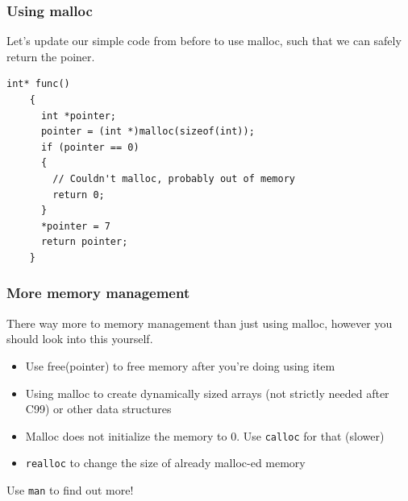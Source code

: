 \documentclass{beamer}
\begin{document}
\begin{frame}[fragile]
  \frametitle{Using malloc}
  Let's update our simple code from before to use malloc, such that we can safely return the poiner.
  \begin{lstlisting}[style=customc]
    int* func()
    {
      int *pointer;
      pointer = (int *)malloc(sizeof(int));
      if (pointer == 0)
      {
        // Couldn't malloc, probably out of memory
        return 0;
      }
      *pointer = 7
      return pointer;
    }
    \end{lstlisting}
\end{frame}
\begin{frame}
  \frametitle{More memory management}
  There way more to memory management than just using malloc, however you should look into this yourself.
  \begin{itemize}
    \item Use free(pointer) to free memory after you're doing using item
    \item Using malloc to create dynamically sized arrays (not strictly needed after C99) or other data structures
    \item Malloc does not initialize the memory to 0. Use \texttt{calloc} for that (slower)
    \item \texttt{realloc} to change the size of already malloc-ed memory
  \end{itemize}
  Use \texttt{man} to find out more!
\end{frame}
\end{document}
